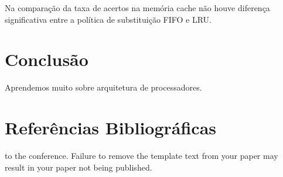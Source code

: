 \documentclass[conference]{IEEEtran}
\begin{document}
Na comparação da taxa de acertos na memória cache não houve diferença significativa entre a política de substituição FIFO e LRU.

\section{Conclusão}

Aprendemos muito sobre arquitetura de processadores.

\section{Referências Bibliográficas}



to the conference. Failure to remove the template text from your paper may result in your paper not being published.
\end{document}
